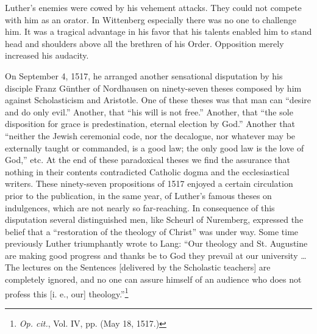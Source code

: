 Luther’s enemies were cowed by his vehement attacks. They could not
compete with him as an orator. In Wittenberg especially there was no one
to challenge him. It was a tragical advantage in his favor that his talents
enabled him to stand head and shoulders above all the brethren of his Order.
Opposition merely increased his audacity.

On September 4, 1517, he arranged another sensational disputation
by his disciple Franz Günther of Nordhausen on ninety-seven
theses composed by him against Scholasticism and Aristotle. One
of these theses was that man can “desire and do only evil.” Another,
that “his will is not free.” Another, that “the sole disposition for
grace is predestination, eternal election by God.” Another that
“neither the Jewish ceremonial code, nor the decalogue, nor whatever
may be externally taught or commanded, is a good law; the
only good law is the love of God,” etc. At the end of these paradoxical
theses we find the assurance that nothing in their contents
contradicted Catholic dogma and the ecclesiastical writers. These
ninety-seven propositions of 1517 enjoyed a certain circulation prior
to the publication, in the same year, of Luther’s famous theses on
indulgences, which are not nearly so far-reaching. In consequence
of this disputation several distinguished men, like Scheurl of Nuremberg,
expressed the belief that a “restoration of the theology of
Christ” was under way. Some time previously Luther triumphantly
wrote to Lang: “Our theology and St. Augustine are making good
progress and thanks be to God they prevail at our university \dots
The lectures on the Sentences [delivered by the Scholastic teachers] are
completely ignored, and no one can assure himself of an audience
who does not profess this [i. e., our] theology.”\footnote{\textit{Op. cit.}, Vol. IV, pp. (May 18, 1517.)}

